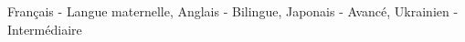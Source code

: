 
\vspace{\ItemsSpacing}

{Fran\c cais - \textmd{Langue maternelle,} Anglais - \textmd{Bilingue,} Japonais - \textmd{Avanc\'e,} Ukrainien - \textmd{Interm\'ediaire}}{}{}{}{}








